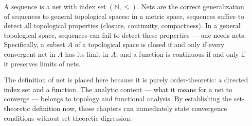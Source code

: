 \begin{remark*}
A sequence is a net with index set $(\mathbb{N}, \leq)$. Nets are the correct
generalization of sequences to general topological spaces: in a metric space,
sequences suffice to detect all topological properties (closure, continuity,
compactness). In a general topological space, sequences can fail to detect
these properties — one needs nets. Specifically, a subset $A$ of a
topological space is closed if and only if every convergent net in $A$ has
its limit in $A$; and a function is continuous if and only if it preserves
limits of nets.

The definition of net is placed here because it is purely order-theoretic:
a directed index set and a function. The analytic content — what it means
for a net to converge — belongs to topology and functional analysis. By
establishing the set-theoretic definition now, those chapters can immediately
state convergence conditions without set-theoretic digression.
\end{remark*}
